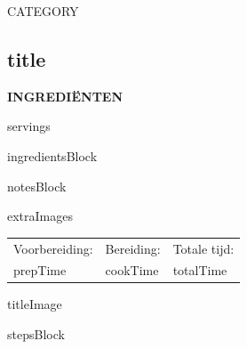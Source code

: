 \newpage

\begin{center}
    \uppercase{{{category}}}
    \subsection{{{title}}}
\end{center}

\vspace{0.5cm}

\begin{paracol}{2}

\uppercase{\textbf{Ingrediënten}}

\vspace{0.25cm}

{{servings}}

\vspace{0.5cm}

{{ingredientsBlock}}

{{notesBlock}}

{{extraImages}}

\switchcolumn

{\renewcommand{\arraystretch}{2}
    \begin{tabularx}{\linewidth}{YYY}
        Voorbereiding: & Bereiding: & Totale tijd: \\
        {{prepTime}} & {{cookTime}} & {{totalTime}} \\
        \hline
    \end{tabularx}
}

\vspace{0.25cm}

{{titleImage}}

\vspace{0.5cm}

{{stepsBlock}}

\end{paracol}
